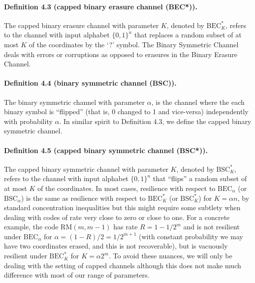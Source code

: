 \paragraph{Definition 4.3 (capped binary erasure channel (BEC*)).} The capped binary erasure channel with parameter $K$, denoted by $\mathrm{BEC}_K^*$, refers to the channel with input alphabet $\{0,1\}^n$ that replaces a random subset of at most $K$ of the coordinates by the `?' symbol.
The Binary Symmetric Channel deals with errors or corruptions as opposed to erasures in the Binary Erasure Channel.
\paragraph{Definition 4.4 (binary symmetric channel (BSC)).} The binary symmetric channel with parameter $\alpha$, is the channel where the each binary symbol is ``flipped'' (that is, 0 changed to 1 and vice-versa) independently with probability $\alpha$.
In similar spirit to Definition 4.3, we define the capped binary symmetric channel.
\paragraph{Definition 4.5 (capped binary symmetric channel (BSC*)).} The capped binary symmetric channel with parameter $K$, denoted by $\mathrm{BSC}_K^*$, refers to the channel with input alphabet $\{0,1\}^n$ that ``flips'' a random subset of at most $K$ of the coordinates.
In most cases, resilience with respect to $\mathrm{BEC}_\alpha$ (or $\mathrm{BSC}_\alpha$) is the same as resilience with respect to $\mathrm{BEC}_K^*$ (or $\mathrm{BSC}_K^*$) for $K=\alpha n$, by standard concentration inequalities but this might require some subtlety when dealing with codes of rate very close to zero or close to one. For a concrete example, the code $\mathrm{RM}(m,m-1)$ has rate $R=1-1/2^m$ and is not resilient under $\mathrm{BEC}_\alpha$ for $\alpha=(1-R)/2=1/2^{m+1}$ (with constant probability we may have two coordinates erased, and this is not recoverable), but is vacuously resilient under $\mathrm{BEC}_K^*$ for $K=\alpha2^m$. To avoid these nuances, we will only be dealing with the setting of capped channels although this does not make much difference with most of our range of parameters.

